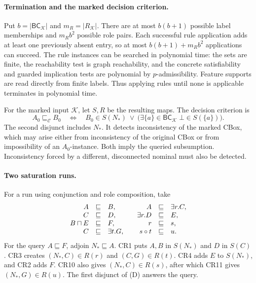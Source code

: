 \paragraph{Termination and the marked decision criterion.}
\label{sec:p09-elpp-query-correctness}
Put \(b=|\mathsf{BC}_{\mathcal K}|\) and \(m_R=|R_{\mathcal K}|\).
There are at most \(b(b+1)\) possible label memberships and \(m_Rb^2\)
possible role pairs.  Each successful rule application adds at least one
previously absent entry, so at most \(b(b+1)+m_Rb^2\) applications can succeed.
The rule instances can be searched in polynomial time: the sets are finite,
the reachability test is graph reachability, and the concrete satisfiability
and guarded implication tests are polynomial by \(p\)-admissibility.
Feature supports are read directly from finite labels.  Thus applying rules
until none is applicable terminates in polynomial time.

For the marked input \(\mathcal K\), let \(S,R\) be the resulting maps.
The decision criterion is
\[
 A_0\sqsubseteq_{\mathcal C}B_0
 \quad\Longleftrightarrow\quad
 B_0\in S(N_\ast)
 \ \lor\
 \bigl(\exists\{a\}\in\mathsf{BC}_{\mathcal K}\;
                         \bot\in S(\{a\})\bigr).
 \tag{D}
\]
The second disjunct includes \(N_\ast\).
It detects inconsistency of the marked CBox, which may arise either from
inconsistency of the original CBox or from impossibility of an
\(A_0\)-instance.  Both imply the queried subsumption.  Inconsistency forced
by a different, disconnected nominal must also be detected.

\paragraph{Two saturation runs.}
For a run using conjunction and role composition, take
\[
\begin{array}{rcl@{\qquad}rcl}
 A&\sqsubseteq&B, & A&\sqsubseteq&\exists r.C,\\
 C&\sqsubseteq&D, & \exists r.D&\sqsubseteq&E,\\
 B\sqcap E&\sqsubseteq&F, & r&\sqsubseteq&s,\\
 C&\sqsubseteq&\exists t.G, & s\circ t&\sqsubseteq&u.
\end{array}
\]
For the query \(A\sqsubseteq F\), adjoin \(N_\ast\sqsubseteq A\).
CR1 puts \(A,B\) in \(S(N_\ast)\) and \(D\) in \(S(C)\).
CR3 creates \((N_\ast,C)\in R(r)\) and \((C,G)\in R(t)\).
CR4 adds \(E\) to \(S(N_\ast)\), and CR2 adds \(F\).
CR10 also gives \((N_\ast,C)\in R(s)\), after which CR11 gives
\((N_\ast,G)\in R(u)\).  The first disjunct of (D) answers the query.

